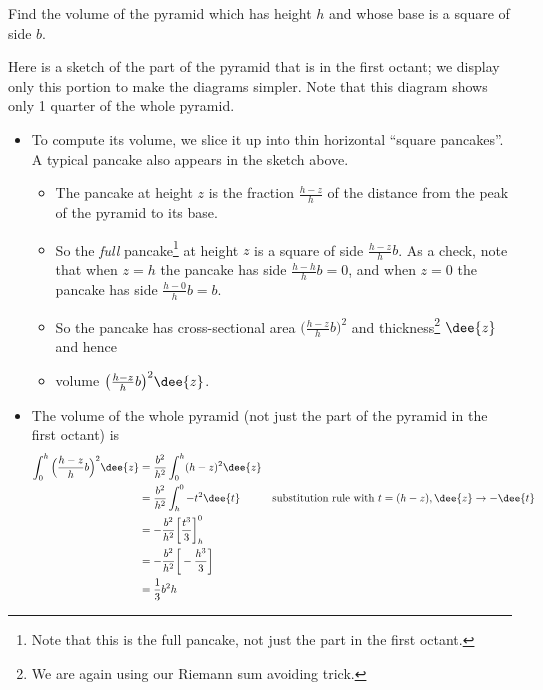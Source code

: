 \begin{eg}[Pyramid]\label{eg:VOLb}
Find the volume of the pyramid which has height $h$ and whose base is a
square of side $b$.

\soln Here is a sketch of the part of the pyramid that is in the
first octant; we display only this portion to make the diagrams simpler.
Note that this diagram shows only 1 quarter of the whole pyramid.

\begin{itemize}
 \item To compute its volume, we slice it up into thin horizontal ``square pancakes''. A
typical pancake also appears in the sketch above.


\begin{itemize}
\item The pancake at height $z$ is the fraction $\frac{h-z}{h}$ of the distance from the
peak of the pyramid to its base.
\item So the \emph{full} pancake\footnote{Note that this is the full pancake, not just
the part in the first octant.} at height $z$ is a square of side $\frac{h-z}{h}b$. As a
check, note that when $z=h$ the pancake has side  $\frac{h-h}{h}b=0$, and when $z=0$ the
pancake has side  $\frac{h-0}{h}b=b$.
\item So the pancake has cross-sectional area $\big(\frac{h-z}{h}b\big)^2$ and
thickness\footnote{We are again using our Riemann sum avoiding trick.} $\dee{z}$ and
hence
\item volume $\big(\frac{h-z}{h}b\big)^2\dee{z}$.
\end{itemize}
\item The volume of the whole pyramid (not just the part of the pyramid in the first
octant) is
\begin{align*}
\int_0^h \Big(\frac{h-z}{h}b\Big)^2\dee{z}
&=\frac{b^2}{h^2} \int_0^h (h-z)^2\dee{z} \\
&=\frac{b^2}{h^2} \int_h^0 -t^2\dee{t} & \text{substitution rule with
$t=(h-z), \dee{z}\to-\dee{t}$} \\
&=-\frac{b^2}{h^2}\bigg[\frac{t^3}{3}\bigg]_h^0\\
&=-\frac{b^2}{h^2}\bigg[-\frac{h^3}{3}\bigg] \\
&=\frac{1}{3} b^2h
\end{align*}

\end{itemize}

\end{eg}

